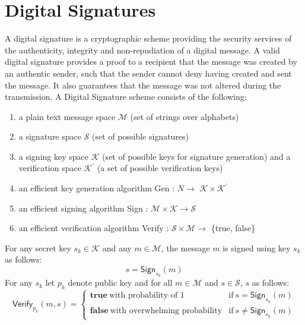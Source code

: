 \section{Digital Signatures}
	\label{sec:digital-signature}
	A digital signature is a cryptographic scheme providing the security services of the authenticity, integrity and non-repudiation of a digital message. 
	A valid digital signature provides a proof to a recipient that the message was created by an authentic sender, such that the sender cannot deny having created and sent the message.
	It also guarantees that the message was not altered during the transmission.
	A Digital Signature scheme consists of the following:
	\begin{enumerate}
		\item a plain text message space $\mathcal{M}$ (set of strings over alphabets)
		\item a signature space $\mathcal{S}$ (set of possible signatures)
		\item a signing key space $\mathcal{K}$ (set of possible keys for signature generation) and a verification space $\mathcal{K^{'}}$ (a set of possible verification keys)
		\item an efficient key generation algorithm \textsf{Gen} : $N \rightarrow$ $\mathcal{K} \times \mathcal{K^{'}} $ 
		\item an efficient signing algorithm \textsf{Sign} : $ \mathcal{M} \times \mathcal{K} \rightarrow \mathcal{S}$
		\item an efficient verification algorithm \textsf{Verify} : $\mathcal{S} \times \mathcal{M} \rightarrow$ \{true, false\} 
	\end{enumerate}
	For any secret key $s_{k} \in \mathcal{K}$ and any $m \in \mathcal{M}$,	the message $m$ is signed using key $s_{k}$ as follows:
		\begin{equation}
			s = \textsf{Sign}_{s_{k}}(m)
			\label{eq:signature}
		\end{equation}
	For any $s_{k}$ let $p_{k}$ denote public key and for all $m \in \mathcal{M}$ and $s \in \mathcal{S}$, $s$ as follows:
	\begin{equation}
		\textsf{Verify}_{p_{k}}(m,s) = 
		\begin{cases}
		 \textbf{true}\ \mbox{with probability of 1} & \mbox{if}\ s = \textsf{Sign}_{s_{k}}(m)\\
		 \textbf{false}\ \mbox{with overwhelming probability} & \mbox{if}\ s \neq \textsf{Sign}_{s_{k}}(m)
		\end{cases}
		\label{eq:verification}
	\end{equation}
